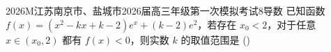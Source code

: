 
\begin{problem}{2026}{M}{江苏南京市、盐城市2026届高三年级第一次模拟考试}{8}{导数}
已知函数 $f(x)=(x^2-kx+k-2)e^x+(k-2)e^2$，若存在 $x_0<2$，对于任意 $x\in(x_0,2)$ 都有 $f(x)<0$，则实数 $k$ 的取值范围是
(\hspace{1cm})
\begin{choices}
\end{choices}
\end{problem}